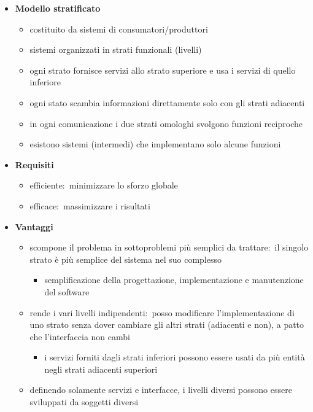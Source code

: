 \begin{itemize}
    \item \textbf{Modello stratificato}
          \begin{itemize}
              \item costituito da sistemi di consumatori/produttori
              \item sistemi organizzati in strati funzionali (livelli)
              \item ogni strato fornisce servizi allo strato superiore e usa i servizi di quello inferiore
              \item ogni stato scambia informazioni direttamente solo con gli strati adiacenti
              \item in ogni comunicazione i due strati omologhi svolgono funzioni reciproche
              \item esistono sistemi (intermedi) che implementano solo alcune funzioni
          \end{itemize}
    \item \textbf{Requisiti}
          \begin{itemize}
              \item efficiente:\ minimizzare lo sforzo globale
              \item efficace:\ massimizzare i risultati
          \end{itemize}
          \pagebreak
    \item \textbf{Vantaggi}
          \begin{itemize}
              \item scompone il problema in sottoproblemi più semplici da trattare:\ il singolo strato è più semplice del sistema nel suo complesso
                    \begin{itemize}
                        \item semplificazione della progettazione, implementazione e manutenzione del software
                    \end{itemize}
              \item rende i vari livelli indipendenti:\ posso modificare l'implementazione di uno strato senza dover cambiare gli altri strati (adiacenti e non), a patto che l'interfaccia non cambi
                    \begin{itemize}
                        \item i servizi forniti dagli strati inferiori possono essere usati da più entità negli strati adiacenti superiori
                    \end{itemize}
              \item definendo solamente servizi e interfacce, i livelli diversi possono essere sviluppati da soggetti diversi
          \end{itemize}
\end{itemize}

